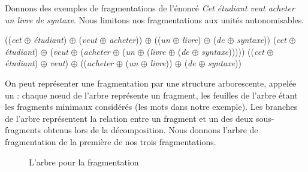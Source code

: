 Donnons des exemples de fragmentations de l’énoncé  \textit{Cet étudiant veut acheter un livre de syntaxe}. Nous limitons nos fragmentations aux unités autonomisables.

\ea
\ea ((\textit{cet} ${\oplus}$ \textit{étudiant}) ${\oplus}$ (\textit{veut} ${\oplus}$ \textit{acheter})) ${\oplus}$ ((\textit{un} ${\oplus}$ \textit{livre}) ${\oplus}$ (\textit{de} ${\oplus}$ \textit{syntaxe}))\label{ex:fragmentation:1}
\ex (\textit{cet} ${\oplus}$ \textit{étudiant}) ${\oplus}$ (\textit{veut} ${\oplus}$ (\textit{acheter} ${\oplus}$ (\textit{un} ${\oplus}$  (\textit{livre} ${\oplus}$ (\textit{de} ${\oplus}$ \textit{syntaxe})))))
\ex ((\textit{cet} ${\oplus}$ \textit{étudiant}) ${\oplus}$  \textit{veut}) ${\oplus}$ ((\textit{acheter} ${\oplus}$ (\textit{un} ${\oplus}$ \textit{livre})) ${\oplus}$ (\textit{de} ${\oplus}$ \textit{syntaxe}))
\z
\z

On peut représenter une fragmentation par une structure arborescente, appelée un  : chaque nœud de l’arbre représente un fragment, les feuilles de l’arbre étant les fragments minimaux considérés (les mots dans notre exemple). Les branches de l’arbre représentent la relation entre un fragment et un des deux sous-fragments obtenus lors de la décomposition. Nous donnons l’arbre de fragmentation de la première de nos trois fragmentations.

\begin{figure}
\caption{L’arbre pour la fragmentation }
\end{figure}

